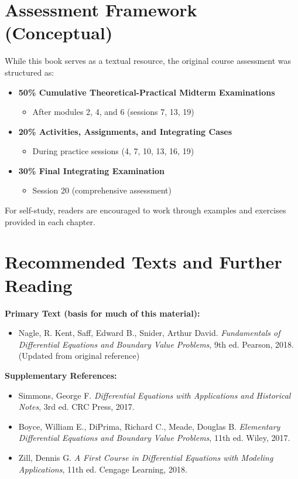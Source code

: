 \documentclass[12pt, letterpaper]{book}
\begin{document}
\chapter{Assessment Framework (Conceptual)}
\label{app:assessment}
While this book serves as a textual resource, the original course assessment was structured as:
\begin{itemize}
    \item \textbf{50\% Cumulative Theoretical-Practical Midterm Examinations}
    \begin{itemize}
        \item After modules 2, 4, and 6 (sessions 7, 13, 19)
    \end{itemize}

    \item \textbf{20\% Activities, Assignments, and Integrating Cases}
    \begin{itemize}
        \item During practice sessions (4, 7, 10, 13, 16, 19)
    \end{itemize}

    \item \textbf{30\% Final Integrating Examination}
    \begin{itemize}
        \item Session 20 (comprehensive assessment)
    \end{itemize}
\end{itemize}
For self-study, readers are encouraged to work through examples and exercises provided in each chapter.

\chapter{Recommended Texts and Further Reading}
\label{app:texts}
\textbf{Primary Text (basis for much of this material):}
\begin{itemize}
    \item Nagle, R. Kent, Saff, Edward B., Snider, Arthur David. \textit{Fundamentals of Differential Equations and Boundary Value Problems}, 9th ed. Pearson, 2018. (Updated from original reference)
\end{itemize}

\textbf{Supplementary References:}
\begin{itemize}
    \item Simmons, George F. \textit{Differential Equations with Applications and Historical Notes}, 3rd ed. CRC Press, 2017.
    \item Boyce, William E., DiPrima, Richard C., Meade, Douglas B. \textit{Elementary Differential Equations and Boundary Value Problems}, 11th ed. Wiley, 2017.
    \item Zill, Dennis G. \textit{A First Course in Differential Equations with Modeling Applications}, 11th ed. Cengage Learning, 2018.
\end{itemize}
\end{document}
